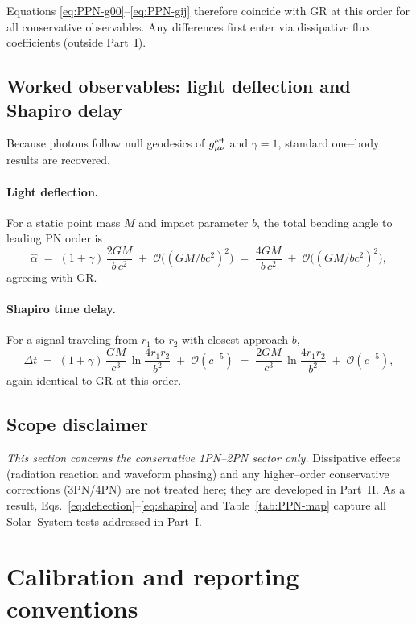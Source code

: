 \documentclass{article}
\begin{document}
\noindent
Equations \eqref{eq:PPN-g00}--\eqref{eq:PPN-gij} therefore coincide with GR at this order for all conservative observables. Any differences first enter via dissipative flux coefficients (outside Part~I).

\subsection{Worked observables: light deflection and Shapiro delay}
\label{subsec:light-tests}
Because photons follow null geodesics of $g^{\rm eff}_{\mu\nu}$ and $\gamma=1$, standard one--body results are recovered.

\paragraph{Light deflection.}
For a static point mass $M$ and impact parameter $b$, the total bending angle to leading PN order is
\begin{equation}
\hat\alpha \;=\; (1+\gamma)\,\frac{2GM}{b\,c^2} \;+\; \mathcal{O}\!\big((GM/bc^2)^2\big)
\;=\; \frac{4GM}{b\,c^2} \;+\; \mathcal{O}\!\big((GM/bc^2)^2\big),
\label{eq:deflection}
\end{equation}
agreeing with GR.

\paragraph{Shapiro time delay.}
For a signal traveling from $r_1$ to $r_2$ with closest approach $b$,
\begin{equation}
\Delta t \;=\; (1+\gamma)\,\frac{GM}{c^3}\,\ln\!\frac{4 r_1 r_2}{b^2}
\;+\; \mathcal{O}(c^{-5})
\;=\; \frac{2GM}{c^3}\,\ln\!\frac{4 r_1 r_2}{b^2} \;+\; \mathcal{O}(c^{-5}),
\label{eq:shapiro}
\end{equation}
again identical to GR at this order.

\subsection{Scope disclaimer}
\label{subsec:PPN-scope}
\emph{This section concerns the conservative 1PN--2PN sector only.} Dissipative effects (radiation reaction and waveform phasing) and any higher--order conservative corrections (3PN/4PN) are not treated here; they are developed in Part~II. As a result, Eqs.~\eqref{eq:deflection}--\eqref{eq:shapiro} and Table~\ref{tab:PPN-map} capture all Solar--System tests addressed in Part~I.

\section{Calibration and reporting conventions}
\label{sec:calibration}
\end{document}
